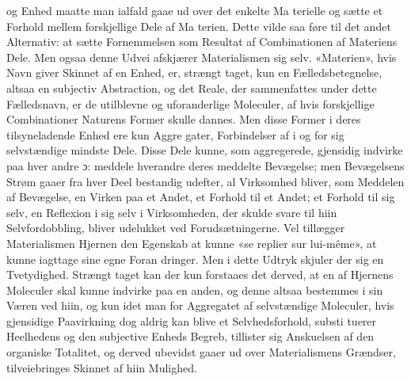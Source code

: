 \documentclass[12pt,a4paper]{book}
\begin{document}
og Enhed maatte man ialfald gaae ud over det enkelte Ma\-%
terielle og sætte et Forhold mellem forskjellige Dele af Ma\-%
terien. Dette vilde saa føre til det andet Alternativ: at sætte
Fornemmelsen som Resultat af Combinationen af Materiens
Dele. Men ogsaa denne Udvei afskjærer Materialismen sig
selv. «Materien», hvis Navn giver Skinnet af en Enhed, er,
strængt taget, kun en Fælledsbetegnelse, altsaa en subjectiv
Abstraction, og det Reale, der sammenfattes under dette
Fælledsnavn, er de utilblevne og uforanderlige Moleculer, af
hvis forskjellige Combinationer Naturens Former skulle dannes.
Men disse Former i deres tilsyneladende Enhed ere kun Aggre\-%
gater, Forbindelser af i og for sig selvstændige mindste Dele.
Disse Dele kunne, som aggregerede, gjensidig indvirke paa hver\-%
andre ɔ: meddele hverandre deres meddelte Bevægelse; men
Bevægelsens Strøm gaaer fra hver Deel bestandig udefter, al
Virksomhed bliver, som Meddelen af Bevægelse, en Virken paa
et Andet, et Forhold til et Andet; et Forhold til sig selv, en
Reflexion i sig selv i Virksomheden, der skulde svare til hiin
Selvfordobbling, bliver udelukket ved Forudsætningerne. Vel
tillægger Materialismen Hjernen den Egenskab at kunne «se
replier sur lui-même», at kunne iagttage sine egne Foran\-%
dringer. Men i dette Udtryk skjuler der sig en Tvetydighed.
Strængt taget kan der kun forstaaes det derved, at en af
Hjernens Moleculer skal kunne indvirke paa en anden, og
denne altsaa bestemmes i sin Væren ved hiin, og kun idet
man for Aggregatet af selvstændige Moleculer, hvis gjensidige
Paavirkning dog aldrig kan blive et Selvhedsforhold, substi\-%
tuerer Heelhedens og den subjective Enheds Begreb, tillister
sig Anskuelsen af den organiske Totalitet, og derved ubevidst
gaaer ud over Materialismens Grændser, tilveiebringes Skinnet
af hiin Mulighed.
\end{document}
